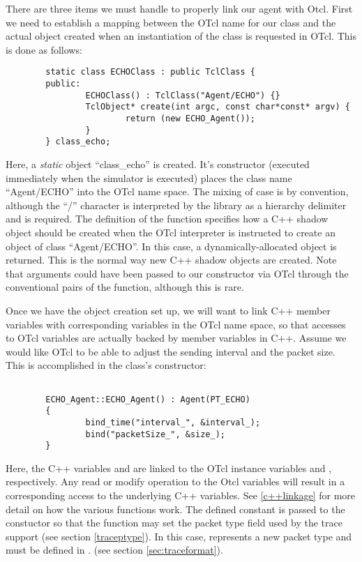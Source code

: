 There are three items we must handle to properly link our agent
with Otcl.
First we need to establish a mapping between the OTcl name
for our class and the actual object created when an
instantiation of the class is requested in OTcl.
This is done as follows:
\begin{small}
\begin{verbatim}
        static class ECHOClass : public TclClass {
        public:
                ECHOClass() : TclClass("Agent/ECHO") {}
                TclObject* create(int argc, const char*const* argv) {
                        return (new ECHO_Agent());
                }
        } class_echo;
\end{verbatim}
\end{small}

Here, a {\em static} object ``class\_echo'' is created. It's constructor
(executed immediately when the simulator is executed) places the class name
``Agent/ECHO'' into the OTcl name space.  The mixing of case is
by convention, although the ``/'' character is interpreted by the
 library as a hierarchy delimiter and is required.
The definition of the  function specifies how a C++
shadow object should be created when
the OTcl interpreter is instructed to create an
object of class ``Agent/ECHO''.  In this case, a dynamically-allocated
object is returned.  This is the normal way new C++ shadow objects
are created.
Note that arguments could have been passed to our constructor
via OTcl through the conventional  pairs of the
 function, although this is rare.

Once we have the object creation set up, we will want to link
C++ member variables with corresponding variables in the OTcl
name space, so that accesses to OTcl variables are actually
backed by member variables in C++.
Assume we would like OTcl to be able to adjust the sending
interval and the packet size.
This is accomplished in the class's constructor:
\begin{small}
\begin{verbatim}

        ECHO_Agent::ECHO_Agent() : Agent(PT_ECHO)
        {
                bind_time("interval_", &interval_);
                bind("packetSize_", &size_);
        }
\end{verbatim}
\end{small}

Here, the C++ variables  and  are
linked to the OTcl instance variables  and
, respectively.
Any read or modify operation to the Otcl variables will result
in a corresponding access to the underlying C++ variables.
See \ref{c++linkage} for more detail on how the various 
functions work.
The defined constant  is passed to the 
constuctor so that the  function may set
the packet type field used by the trace support
(see section \ref{traceptype}).  In this case,  represents
a new packet type and must be defined in .
(see section \ref{sec:traceformat}).

